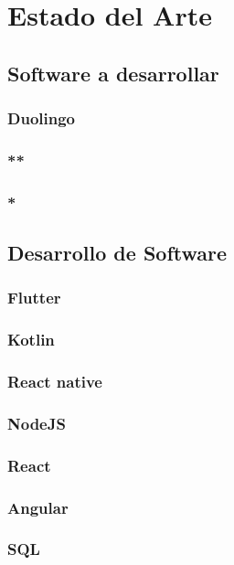     \chapter{Estado del Arte}
    \section{Software a desarrollar}
    \subsection{Duolingo}
    \subsection{**}
    \subsection{*}




    \section{Desarrollo de Software}
\subsection{Flutter}
\subsection{Kotlin}
\subsection{React native}
\subsection{NodeJS}

\subsection{React}
\subsection{Angular}
\subsection{SQL}